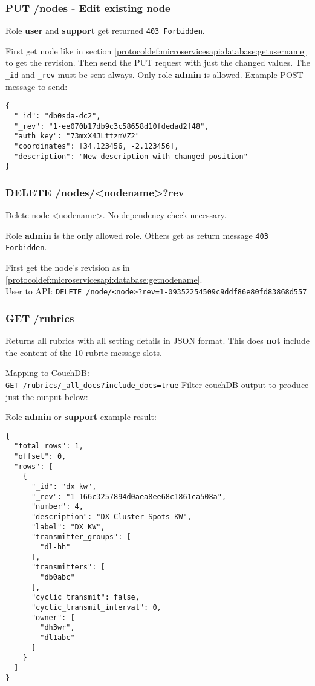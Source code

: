 \subsubsection{PUT /nodes - Edit existing node}
Role \textbf{user} and \textbf{support} get returned \verb|403 Forbidden|.

First get node like in section \ref{protocoldef:microservicesapi:database:getusername} to get the revision. Then send the PUT request with just the changed values. The \verb|_id| and \verb|_rev| must be sent always.
Only role \textbf{admin} is allowed.
Example POST message to send:

\begin{lstlisting}
{
  "_id": "db0sda-dc2",
  "_rev": "1-ee070b17db9c3c58658d10fdedad2f48",
  "auth_key": "73mxX4JLttzmVZ2"
  "coordinates": [34.123456, -2.123456],
  "description": "New description with changed position"
}
\end{lstlisting}

\subsubsection{DELETE /nodes/<nodename>?rev=}
Delete node <nodename>. No dependency check necessary.

Role \textbf{admin} is the only allowed role. Others get as return message \verb|403 Forbidden|.

First get the node's revision as in \ref{protocoldef:microservicesapi:database:getnodename}.\\
User to API: \verb|DELETE /node/<node>?rev=1-09352254509c9ddf86e80fd83868d557|


\subsubsection{GET /rubrics}
\label{protocoldef:microservicesapi:database:rubrics}
Returns all rubrics with all setting details in JSON format. This does \textbf{not} include the content of the 10 rubric message slots.

Mapping to CouchDB:\\
\verb|GET /rubrics/_all_docs?include_docs=true|
Filter couchDB output to produce just the output below:

Role \textbf{admin} or \textbf{support} example result:
\begin{lstlisting}
{
  "total_rows": 1,
  "offset": 0,
  "rows": [
    {
      "_id": "dx-kw",
      "_rev": "1-166c3257894d0aea8ee68c1861ca508a",
      "number": 4,
      "description": "DX Cluster Spots KW",
      "label": "DX KW",
      "transmitter_groups": [
        "dl-hh"
      ],
      "transmitters": [
        "db0abc"
      ],
      "cyclic_transmit": false,
      "cyclic_transmit_interval": 0,
      "owner": [
        "dh3wr",
        "dl1abc"
      ]
    }
  ]
}
\end{lstlisting}

